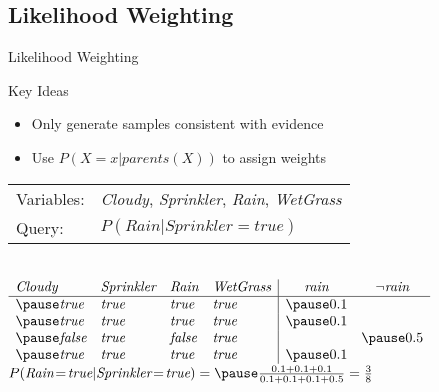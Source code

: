 \documentclass[14pt]{beamer}
\begin{document}
\subsection{Likelihood Weighting}
\begin{frame}{Likelihood Weighting}
	\begin{block}{Key Ideas}
		\begin{itemize}
			\item Only generate samples consistent with evidence
			\item Use $P(X\!=\!x|\textit{parents}(X))$ to assign weights
		\end{itemize}
	\end{block}
	\medskip
	\pause
	\begin{tabular}{ll}
		Variables: & \textit{Cloudy}, \textit{Sprinkler}, \textit{Rain}, \textit{WetGrass} \\
		Query:     & $P(\textit{Rain}|\textit{Sprinkler}\!=\!\textit{true})$
	\end{tabular}
	\\
	\smallskip
	$
	\begin{array}{llll|cc}
		\textit{Cloudy} & \textit{Sprinkler} & \textit{Rain}  & \textit{WetGrass} & \textit{rain}  & \lnot\textit{rain} \\
		\hline
		\pause
		\textit{true}   & \textit{true}      & \textit{true}  & \textit{true}     & \pause 0.1 &                \\
		\pause
		\textit{true}   & \textit{true}      & \textit{true}  & \textit{true}     & \pause 0.1 &                \\
		\pause
		\textit{false}  & \textit{true}      & \textit{false} & \textit{true}     &            & \pause 0.5     \\
		\pause
		\textit{true}   & \textit{true}      & \textit{true}  & \textit{true}     & \pause 0.1 &                \\
	\end{array}
	$
	\\
	\smallskip
	\pause
	\tab$P(\textit{Rain}\!=\!\textit{true}|\textit{Sprinkler}\!=\!\textit{true})=\pause\frac{0.1 + 0.1 + 0.1}{0.1 + 0.1 + 0.1 + 0.5} = \frac{3}{8}$
\end{frame}
\end{document}
